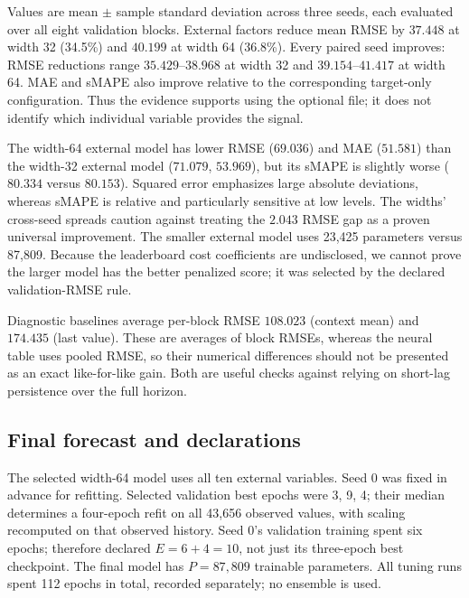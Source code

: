 \documentclass[10pt]{article}
\begin{document}
\begin{center}\end{center}
Values are mean $\pm$ sample standard deviation across three seeds, each evaluated over all eight validation blocks. External factors reduce mean RMSE by $37.448$ at width 32 (34.5\%) and $40.199$ at width 64 (36.8\%). Every paired seed improves: RMSE reductions range $35.429$--$38.968$ at width 32 and $39.154$--$41.417$ at width 64. MAE and sMAPE also improve relative to the corresponding target-only configuration. Thus the evidence supports using the optional file; it does not identify which individual variable provides the signal.

The width-64 external model has lower RMSE ($69.036$) and MAE ($51.581$) than the width-32 external model ($71.079$, $53.969$), but its sMAPE is slightly worse ($80.334$ versus $80.153$). Squared error emphasizes large absolute deviations, whereas sMAPE is relative and particularly sensitive at low levels. The widths' cross-seed spreads caution against treating the $2.043$ RMSE gap as a proven universal improvement. The smaller external model uses 23,425 parameters versus 87,809. Because the leaderboard cost coefficients are undisclosed, we cannot prove the larger model has the better penalized score; it was selected by the declared validation-RMSE rule.

Diagnostic baselines average per-block RMSE $108.023$ (context mean) and $174.435$ (last value). These are averages of block RMSEs, whereas the neural table uses pooled RMSE, so their numerical differences should not be presented as an exact like-for-like gain. Both are useful checks against relying on short-lag persistence over the full horizon.

\subsection*{Final forecast and declarations}
The selected width-64 model uses all ten external variables. Seed 0 was fixed in advance for refitting. Selected validation best epochs were 3, 9, 4; their median determines a four-epoch refit on all 43,656 observed values, with scaling recomputed on that observed history. Seed 0's validation training spent six epochs; therefore declared $E=6+4=10$, not just its three-epoch best checkpoint. The final model has $P=87{,}809$ trainable parameters. All tuning runs spent 112 epochs in total, recorded separately; no ensemble is used.
\end{document}
